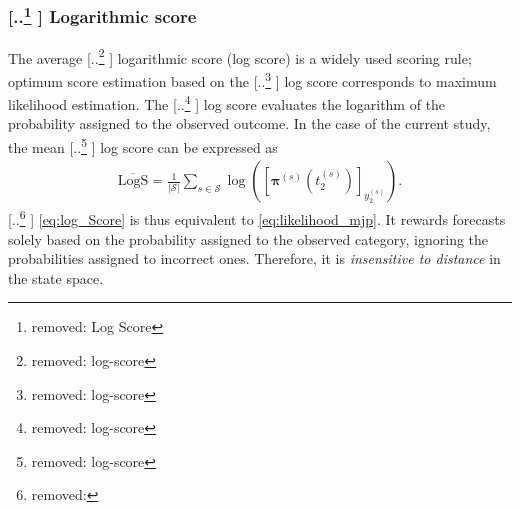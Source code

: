 \documentclass{article}
\providecommand{\DIFadd}[1]{{\protect\color{blue} \sf #1}} %
\providecommand{\DIFdel}[1]{{\protect\color{red} [..\footnote{removed: #1} ]}} %
\providecommand{\DIFaddbegin}{} %
\providecommand{\DIFaddend}{} %
\providecommand{\DIFdelbegin}{} %
\providecommand{\DIFdelend}{} %
\begin{document}
\subsubsection{\DIFdelbegin \DIFdel{Log Score}\DIFdelend \DIFaddbegin \DIFadd{Logarithmic score}\DIFaddend }
The average \DIFdelbegin \DIFdel{log-score }\DIFdelend \DIFaddbegin \DIFadd{logarithmic score (log score) }\DIFaddend is a widely used scoring rule; optimum score estimation based on the \DIFdelbegin \DIFdel{log-score }\DIFdelend \DIFaddbegin \DIFadd{log score }\DIFaddend corresponds to maximum likelihood estimation. The \DIFdelbegin \DIFdel{log-score }\DIFdelend \DIFaddbegin \DIFadd{log score }\DIFaddend evaluates the logarithm of the probability assigned to the observed outcome. In the case of the current study, the mean \DIFdelbegin \DIFdel{log-score }\DIFdelend \DIFaddbegin \DIFadd{log score }\DIFaddend can be expressed as
\begin{align}
    \overline{\text{LogS}} = \frac{1}{\vert \mathcal{S} \vert} \sum_{s \in \mathcal{S}} \log \left( \left[ \bm{\pi}^{(s)}\left( t_2^{(s)} \right)  \right]_{ y_2^{(s)}} \right).  \label{eq:log_Score}
\end{align}
\DIFdelbegin \DIFdel{ }\DIFdelend \DIFaddbegin \DIFadd{\cref{eq:log_Score} }\DIFaddend is thus equivalent to \cref{eq:likelihood_mjp}.
It rewards forecasts solely based on the probability assigned to the observed category, ignoring the probabilities assigned to incorrect ones. Therefore, it is \textit{insensitive to distance} in the state space.  

%
\end{document}
